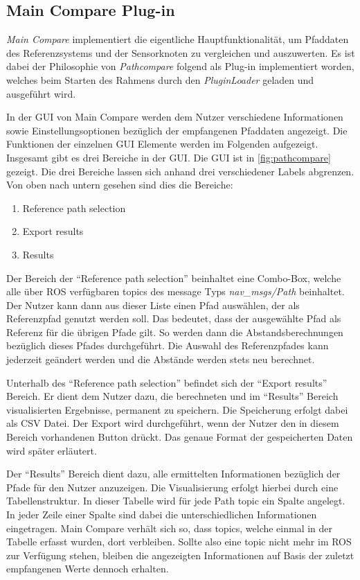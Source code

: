\subsection{Main Compare Plug-in}
\label{sub:maincompare}


\textit{Main Compare} implementiert die eigentliche Hauptfunktionalität, um Pfaddaten des
Referenzsystems und der Sensorknoten zu vergleichen und auszuwerten. 
Es ist dabei der Philosophie von \textit{Pathcompare} folgend als Plug-in
implementiert worden, welches beim Starten des Rahmens durch den
\textit{PluginLoader} geladen und ausgeführt wird.

In der GUI von Main Compare werden dem Nutzer verschiedene Informationen sowie
Einstellungsoptionen bezüglich der
empfangenen Pfaddaten angezeigt. Die Funktionen der einzelnen GUI Elemente
werden im Folgenden aufgezeigt.
Insgesamt gibt es drei Bereiche in der GUI. Die GUI ist in
\autoref{fig:pathcompare} gezeigt. Die drei Bereiche lassen sich anhand drei
verschiedener Labels abgrenzen. Von oben nach untern gesehen sind
dies die Bereiche:

\begin{enumerate}
  \item Reference path selection
  \item Export results
  \item Results
\end{enumerate}


Der Bereich der ``Reference path selection'' beinhaltet eine Combo-Box, welche
alle über ROS verfügbaren topics des message Typs \textit{nav\_msgs/Path} beinhaltet.
Der Nutzer kann dann aus dieser Liste einen Pfad auswählen, der als
Referenzpfad genutzt werden soll. Das bedeutet, dass der ausgewählte Pfad als
Referenz für die übrigen Pfade gilt. So werden dann die Abstandsberechnungen
bezüglich dieses Pfades durchgeführt. Die Auswahl des Referenzpfades kann
jederzeit geändert werden und die Abstände werden stets neu berechnet.

Unterhalb des ``Reference path selection'' befindet sich der ``Export
results'' Bereich. Er dient dem Nutzer dazu, die berechneten und
im ``Results'' Bereich visualisierten Ergebnisse, permanent zu speichern.
Die Speicherung erfolgt dabei als \gls{CSV} Datei. Der Export wird
durchgeführt, wenn der Nutzer den in diesem Bereich vorhandenen Button drückt. 
Das genaue Format der gespeicherten Daten wird später erläutert.

Der ``Results'' Bereich dient dazu, alle ermittelten Informationen bezüglich der
Pfade für den Nutzer anzuzeigen. Die Visualisierung erfolgt hierbei durch eine
Tabellenstruktur. In dieser Tabelle wird für jede Path topic ein Spalte
angelegt.
In jeder Zeile einer Spalte sind dabei die unterschiedlichen
Informationen eingetragen.
Main Compare verhält sich so, dass topics, welche einmal in
der Tabelle erfasst wurden, dort verbleiben. Sollte also eine topic nicht
mehr im ROS zur Verfügung stehen, bleiben die angezeigten Informationen auf
Basis der zuletzt empfangenen Werte dennoch erhalten. 

